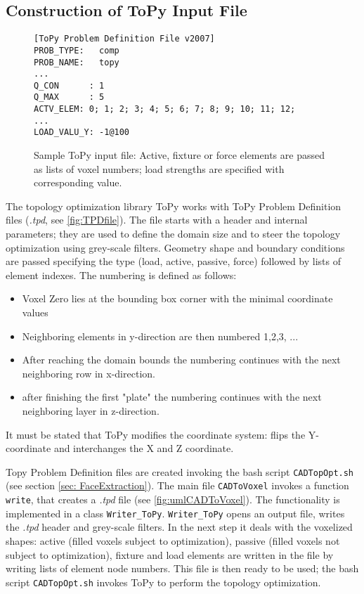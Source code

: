 \subsection{Construction of ToPy Input File}
\label{sec: ToPyInputConstruction}
\begin{figure}
\begin{lstlisting}
[ToPy Problem Definition File v2007]
PROB_TYPE:   comp
PROB_NAME:   topy
...
Q_CON      : 1
Q_MAX      : 5
ACTV_ELEM: 0; 1; 2; 3; 4; 5; 6; 7; 8; 9; 10; 11; 12; 
...
LOAD_VALU_Y: -1@100
\end{lstlisting}
\caption{Sample ToPy input file: Active, fixture or force elements are passed as lists of voxel numbers; load strengths are specified with corresponding value.}
\label{fig:TPDfile}
\end{figure}
The topology optimization library ToPy works with ToPy Problem Definition files ({\it.tpd}, see \autoref{fig:TPDfile}). The file starts with a header and internal parameters; they are used to define the domain size and to steer the topology optimization using grey-scale filters. Geometry shape and boundary conditions are passed specifying the type (load, active, passive, force) followed by lists of element indexes. The numbering is defined as follows:
\begin{itemize}
\item Voxel Zero lies at the bounding box corner with the minimal coordinate values
\item Neighboring elements in y-direction are then numbered 1,2,3, ...
\item After reaching the domain bounds the numbering continues with the next neighboring row in x-direction.
\item after finishing the first "plate" the numbering continues with the next neighboring layer in z-direction.
\end{itemize}
It must be stated that ToPy modifies the coordinate system: flips the Y-coordinate and interchanges the X and Z coordinate. 

Topy Problem Definition files are created invoking the bash script \lstinline|CADTopOpt.sh| (see section \ref{sec: FaceExtraction}). The main file \lstinline|CADToVoxel| invokes a function \lstinline|write|, that creates a {\it.tpd} file (see \autoref{fig:umlCADToVoxel}). The functionality is implemented in a class \lstinline|Writer_ToPy|. \lstinline|Writer_ToPy| opens an output file, writes the {\it.tpd} header and grey-scale filters. In the next step it deals with the voxelized shapes: active (filled voxels subject to optimization), passive (filled voxels not subject to optimization), fixture and load elements are written in the file by writing lists of element node numbers. This file is then ready to be used; the bash script \lstinline|CADTopOpt.sh| invokes ToPy to perform the topology optimization.
